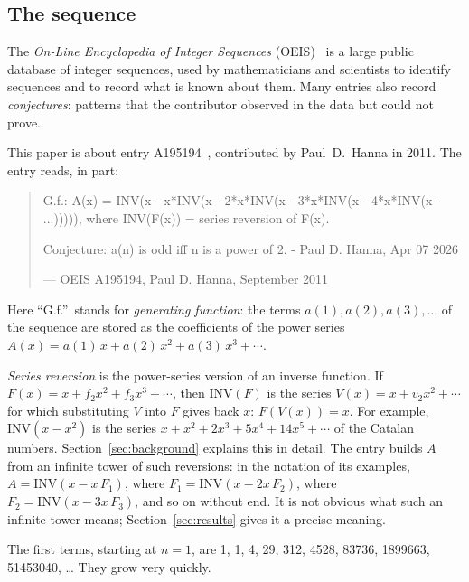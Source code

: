\documentclass[11pt,a4paper]{article}
\theoremstyle{definition}
\theoremstyle{remark}
\begin{document}
\subsection{The sequence}\label{sec:sequence}
The \emph{On-Line Encyclopedia of Integer Sequences} (OEIS)~\cite{oeisdb} is a large public database of integer
sequences, used by mathematicians and scientists to identify sequences and to record what is known about them. Many
entries also record \emph{conjectures}: patterns that the contributor observed in the data but could not prove.

This paper is about entry A195194~\cite{oeis}, contributed by Paul~D.~Hanna in 2011. The entry reads, in part:
\begin{quote}\small\ttfamily\raggedright G.f.: A(x) = INV(x - x*INV(x - 2*x*INV(x - 3*x*INV(x - 4*x*INV(x - ...))))), where INV(F(x)) = series reversion of F(x).\par\smallskip Conjecture: a(n) is odd iff n is a power of 2. - Paul D. Hanna, Apr 07 2026\par\smallskip\hfill\textrm{--- OEIS A195194, Paul D. Hanna, September 2011}\end{quote}

Here ``G.f.''\ stands for \emph{generating function}: the terms $a(1),a(2),a(3),\dots$ of the sequence are stored as the
coefficients of the power series $A(x)=a(1)\,x+a(2)\,x^2+a(3)\,x^3+\cdots$.

\emph{Series reversion} is the power-series version of an inverse function. If $F(x)=x+f_2x^2+f_3x^3+\cdots$, then
$\mathrm{INV}(F)$ is the series $V(x)=x+v_2x^2+\cdots$ for which substituting $V$ into $F$ gives back $x$:
$F(V(x))=x$. For example, $\mathrm{INV}(x-x^2)$ is the series $x+x^2+2x^3+5x^4+14x^5+\cdots$ of the Catalan numbers.
Section~\ref{sec:background} explains this in detail. The entry builds $A$ from an infinite tower of such reversions: in
the notation of its examples, $A=\mathrm{INV}(x-x\,F_1)$, where $F_1=\mathrm{INV}(x-2x\,F_2)$, where
$F_2=\mathrm{INV}(x-3x\,F_3)$, and so on without end. It is not obvious what such an infinite tower means;
Section~\ref{sec:results} gives it a precise meaning.

The first terms, starting at $n=1$, are 1, 1, 4, 29, 312, 4528, 83736, 1899663, 51453040, \dots{} They grow very quickly.
\end{document}
